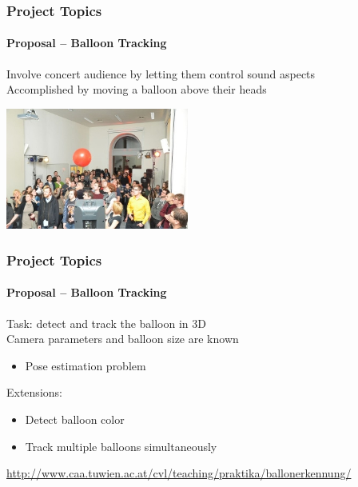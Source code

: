 \documentclass[xetex]{beamer}
\begin{document}

\begin{frame}
\frametitle{Project Topics}
\framesubtitle{Proposal -- Balloon Tracking}

Involve concert audience by letting them control sound aspects\\\medskip
Accomplished by moving a balloon above their heads

\bigskip
\begin{center}
	\includegraphics[width=6cm]{figures/balloon.jpg}
\end{center}

\end{frame}


\begin{frame}
\frametitle{Project Topics}
\framesubtitle{Proposal -- Balloon Tracking}

Task: detect and track the balloon in 3D \\
Camera parameters and balloon size are known
\begin{itemize}
	\item Pose estimation problem
\end{itemize}

\bigskip
Extensions:
\begin{itemize}
	\item Detect balloon color
	\item Track multiple balloons simultaneously
\end{itemize}

\medskip
\begin{center}
	\small\url{http://www.caa.tuwien.ac.at/cvl/teaching/praktika/ballonerkennung/}
\end{center}

\end{frame}

\end{document}

